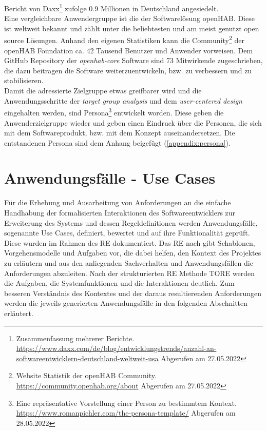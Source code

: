         Bericht von Daxx\footnote{Zusammenfassung mehrerer Berichte. \url{https://www.daxx.com/de/blog/entwicklungstrends/anzahl-an-softwareentwicklern-deutschland-weltweit-usa} Abgerufen am 27.05.2022}
        zufolge 0.9 Millionen in Deutschland angesiedelt. 
        \\
        \linebreak
        Eine vergleichbare Anwendergruppe ist die der Softwarelösung openHAB. Diese ist weltweit bekannt und zählt unter die 
        beliebtesten und am meist genutzt open source Lösungen. Anhand den eigenen Statistiken kann die Community\footnote{Website Statistik der openHAB Community. \url{https://community.openhab.org/about} Abgerufen am 27.05.2022} 
        der openHAB Foundation ca. 42 Tausend Benutzer und Anwender vorweisen. Dem GitHub Repository der \textit{openhab-core} 
        Software sind 73 Mitwirkende zugeschrieben, die dazu beitragen die Software weiterzuentwickeln, bzw. zu verbessern und zu 
        stabilisieren.
    \\
    \linebreak 
    Damit die adressierte Zielgruppe etwas greifbarer wird und die Anwendungsschritte der \textit{target group analysis} und 
    dem \textit{user-centered design} eingehalten werden, sind Persona\footnote{Eine repräsentative Vorstellung einer Person zu bestimmtem Kontext. \url{https://www.romanpichler.com/the-persona-template/} Abgerufen am 28.05.2022} 
    entwickelt worden. Diese geben die Anwenderzielgruppe wieder und geben einen Eindruck über die Personen, die sich mit dem 
    Softwareprodukt, bzw. mit dem Konzept auseinandersetzen. Die entstandenen Persona sind dem Anhang beigefügt 
    (\ref{appendix:persona}). %

\section{Anwendungsfälle - Use Cases}
\label{sec:usecases}
    Für die Erhebung und Ausarbeitung von Anforderungen an die einfache Handhabung der formalisierten 
    Interaktionen des Softwareentwicklers zur Erweiterung des Systems und dessen Regeldefinitionen werden Anwendungsfälle, 
    sogenannte Use Cases, definiert, bewertet und auf ihre Funktionalität geprüft. Diese wurden im Rahmen 
    des \acl{RE} dokumentiert. Das \acs{RE} nach \cite{pohl2021basiswissen} gibt Schablonen, Vorgehensmodelle und Aufgaben 
    vor, die dabei helfen, den Kontext des Projektes zu erläutern und aus den anliegenden Sachverhalten und Anwendungsfällen 
    die Anforderungen abzuleiten. Nach der strukturierten \acs{RE} Methode \ac{TORE} \cite{tore2014} werden die 
    Aufgaben, die Systemfunktionen und die Interaktionen deutlich. Zum besseren Verständnis des Kontextes und der daraus 
    resultierenden Anforderungen werden die jeweils generierten Anwendungsfälle in den folgenden Abschnitten 
    erläutert.
    \\
    \linebreak
